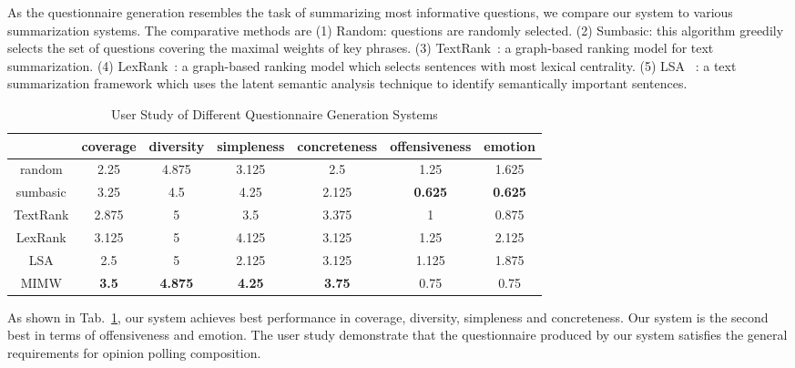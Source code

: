 \documentclass{llncs}
\begin{document}
As the questionnaire generation resembles the task of summarizing most informative questions, we compare our system to various summarization systems. The comparative methods are (1) Random: questions are randomly selected. (2) Sumbasic: this algorithm greedily selects the set of questions covering the maximal weights of key phrases. (3) TextRank~\cite{Mihalcea2004TextRank}: a graph-based ranking model for text summarization. (4) LexRank~\cite{Erkan2004LexRank}: a graph-based ranking model which selects sentences with most lexical centrality. (5) LSA ~\cite{Gong2001Generic}: a text summarization framework which uses the latent semantic analysis technique to identify semantically important sentences.
\begin{table}[htp]
\caption{User Study of Different Questionnaire Generation Systems}
\begin{center}
\begin{tabular}{|c|c|c|c|c|c|c|}
\hline
& coverage & diversity & simpleness & concreteness & offensiveness & emotion \\\hline
random & 2.25 & 4.875 & 3.125 & 2.5 & 1.25 & 1.625 \\\hline
sumbasic & 3.25 & 4.5 & 4.25 & 2.125 & \textbf{0.625} & \textbf{0.625} \\\hline
TextRank & 2.875 & 5 & 3.5 & 3.375 & 1 & 0.875 \\\hline
LexRank & 3.125 & 5 & 4.125 & 3.125 & 1.25 & 2.125 \\\hline
LSA & 2.5 & 5 & 2.125 & 3.125 & 1.125 & 1.875 \\\hline
MIMW & \textbf{3.5} & \textbf{4.875} & \textbf{4.25} & \textbf{3.75} & 0.75 & 0.75 \\\hline
\end{tabular}
\end{center}
\label{tab:userstudy}
\end{table}%

As shown in Tab.~\ref{tab:userstudy}, our system achieves best performance in coverage, diversity, simpleness and concreteness. Our system is the second best in terms of offensiveness and emotion. The user study demonstrate that the questionnaire produced by our system satisfies the general requirements for opinion polling composition.
\end{document}
